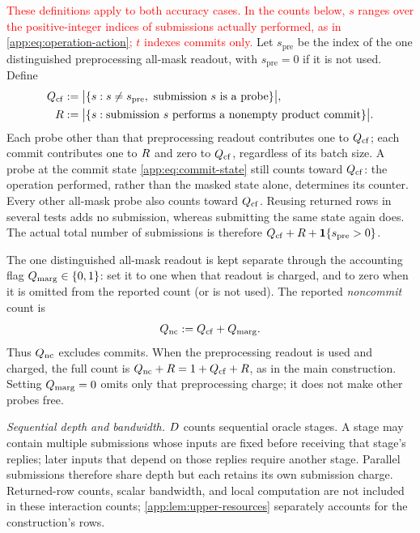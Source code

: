 \begin{definition}[\textcolor{red}{Resources and all-path budgets}]
\label{app:def:resources}
\textcolor{red}{These definitions apply to both accuracy cases.
In the counts below, $s$ ranges over the positive-integer indices of
submissions actually performed, as in \cref{app:eq:operation-action};
$t$ indexes commits only.}
Let $s_{\mathrm{pre}}$ be the index of the one distinguished preprocessing
all-mask readout, with $s_{\mathrm{pre}}=0$ if it is not used. Define
\[
\begin{aligned}
 Q_{\mathrm{cf}}
 &:=\bigl|\{s:s\ne s_{\mathrm{pre}},\
                 \text{submission }s\text{ is a probe}\}\bigr|,\\
 R
 &:=\bigl|\{s:\text{submission }s\text{ performs a nonempty product commit}\}\bigr|.
\end{aligned}
\]
Each probe other than that preprocessing readout contributes one to
$Q_{\mathrm{cf}}$; each commit
contributes one to $R$ and zero to $Q_{\mathrm{cf}}$,
regardless of its batch size. A probe at the commit state
\eqref{app:eq:commit-state} still counts toward $Q_{\mathrm{cf}}$:
the operation performed, rather than the masked state alone, determines
its counter. Every other all-mask probe also counts toward
$Q_{\mathrm{cf}}$. Reusing returned rows in several tests adds
no submission, whereas submitting the same state again does.
The actual total number of submissions is therefore
$Q_{\mathrm{cf}}+R+\mathbf 1\{s_{\mathrm{pre}}>0\}$.

The one distinguished all-mask readout is kept separate through the
accounting flag $Q_{\mathrm{marg}}\in\{0,1\}$: set it to one when
that readout is charged, and to zero when it is omitted from the reported
count (or is not used). The reported \emph{noncommit} count is
\begin{equation}
 Q_{\mathrm{nc}}
 :=Q_{\mathrm{cf}}+Q_{\mathrm{marg}}.
 \label{app:eq:reported-query-count}
\end{equation}
Thus $Q_{\mathrm{nc}}$ excludes commits. When the preprocessing readout
is used and charged, the full count is
$Q_{\mathrm{nc}}+R=1+Q_{\mathrm{cf}}+R$,
as in the main construction. Setting $Q_{\mathrm{marg}}=0$ omits only
that preprocessing charge; it does not make other probes free.

\emph{Sequential depth and bandwidth.}
$D$ counts sequential oracle stages. A stage may contain
multiple submissions whose inputs are fixed before receiving that
stage's replies; later inputs that depend on those replies require
another stage. Parallel submissions therefore share depth but each
retains its own submission charge. Returned-row counts, scalar bandwidth,
and local computation are not included in these interaction counts;
\cref{app:lem:upper-resources} separately accounts for the construction's rows.


\end{definition}
